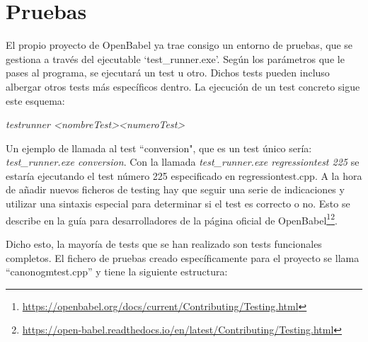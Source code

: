 \begin{longtable}{c>{\centering}m{5cm}>{\centering\arraybackslash}m{5.9cm}}
    
    \label{tab:alias_vs_no_alias}
\end{longtable}



\newpage



\section{Pruebas} \label{pruebas}
El propio proyecto de OpenBabel ya trae consigo un entorno de pruebas, que se gestiona a través del ejecutable `test\_runner.exe'. Según los parámetros que le pases al programa, se ejecutará un test u otro. Dichos tests pueden incluso albergar otros tests más específicos dentro. La ejecución de un test concreto sigue este esquema: 
\begin{center}
    \textit{test\textunderscore runner \textless nombreTest\textgreater  \textless numeroTest\textgreater}    
\end{center}

Un ejemplo de llamada al test ``conversion", que es un test único sería: \textit{test\_runner.exe conversion}. Con la llamada \textit{test\_runner.exe regressiontest 225} se estaría ejecutando el test número 225 especificado en regressiontest.cpp. A la hora de añadir nuevos ficheros de testing hay que seguir una serie de indicaciones y utilizar una sintaxis especial para determinar si el test es correcto o no. Esto se describe en la guía para desarrolladores de la página oficial de OpenBabel\footnote{\url{https://openbabel.org/docs/current/Contributing/Testing.html}}\footnotecomma\footnote{\url{https://open-babel.readthedocs.io/en/latest/Contributing/Testing.html}}.

Dicho esto, la mayoría de tests que se han realizado son tests funcionales completos. El fichero de pruebas creado específicamente para el proyecto se llama ``canonogmtest.cpp'' y tiene la siguiente estructura:
\vspace{0.2cm}


